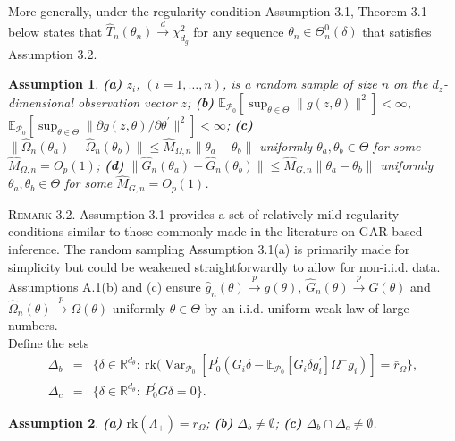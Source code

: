 \documentclass[hidelinks, 11 pt, a4paper, pdflatex]{article}
\DeclareMathOperator{\Var}{Var}
\newtheorem{assumption}{Assumption}[section]
\begin{document}
{   More generally, under the regularity condition Assumption 3.1, Theorem 3.1 below states that $\hat{T}_n(\theta_n) \overset{d}{\rightarrow} \chi_{d_{g}}^{2}$ for any sequence $\theta _{n} \in \Theta _{n}^{0}(\delta)$ that satisfies Assumption 3.2.
    \begin{assumption}
     \textbf{(a)} $z_{i}$, $(i=1,\ldots,n)$, is a random sample of size $n$ on the $d_{z}$-dimensional observation vector $z$;
     \textbf{(b)} $\mathbb{E}_{\mathcal{P}_{0}}[\sup_{\theta \in \Theta} \|g(z,\theta)\|^{2}] < \infty$, $\mathbb{E}_{\mathcal{P}_{0}}[\sup_{\theta \in \Theta} \|\partial
      g(z,\theta)/\partial \theta^{\prime}\|^{2}] < \infty$;
     \textbf{(c)} $\|\hat{\Omega}_{n}(\theta_{a}) - \hat{\Omega}_{n}(\theta_{b})\| \leq \hat{M}_{\Omega,n}\|\theta_{a} - \theta_{b}\|$ uniformly $\theta _{a},\theta _{b} \in \Theta$ for
      some $\hat{M}_{\Omega,n} = O_{p}(1)$;
     \textbf{(d)} $\|\hat{G}_{n}(\theta_{a}) - \hat{G}_{n}(\theta_{b})\| \leq \hat{M}_{G,n}\|\theta_{a}-\theta_{b}\|$ uniformly $\theta _{a},\theta _{b} \in \Theta $ for some
      $\hat{M}_{G,n} = O_{p}(1)$.
    \end{assumption}
    \textsc{Remark 3.2}. Assumption 3.1 provides a set of relatively mild regularity conditions similar to those commonly made
     in the literature on GAR-based inference. The random sampling Assumption 3.1(a) is primarily made for simplicity but could be weakened straightforwardly to allow for non-i.i.d. data. Assumptions A.1(b) and (c) ensure $\hat{g}_{n}(\theta) \overset{p}{\rightarrow} g(\theta)$, $\hat{G}_n(\theta) \overset{p}{\rightarrow} G(\theta)$ and $\hat{\Omega}_{n}(\theta) \overset{p}{\rightarrow} \Omega(\theta)$ uniformly $\theta \in \Theta$ by an i.i.d. uniform weak law of large numbers. \\

   Define the sets
    \begin{eqnarray*}
     \Delta_{b} & = & \{\delta \in \mathbb{R}^{d_{\theta }}:~\mathrm{rk}(\Var_{\mathcal{P}_{0}}[P_{0}^{\prime}(G_i\delta -
      \mathbb{E}_{\mathcal{P}_0}[G_i \delta g_i^{\prime}] \Omega^{-} g_i)] = \bar{r}_{\Omega}\}, \\
     \Delta_{c} & = & \{\delta \in \mathbb{R}^{d_{\theta }}:~P_{0}^{\prime }G\delta = 0\}.
    \end{eqnarray*}

    \begin{assumption}
     \textbf{(a)} $\mathrm{rk}(\Lambda_{+}) = r_{\Omega}$;
     \textbf{(b)} $\Delta_{b} \neq \emptyset$;
     \textbf{(c)} $\Delta_{b} \cap \Delta_{c} \neq \emptyset$.
    \end{assumption}

}
\end{document}
